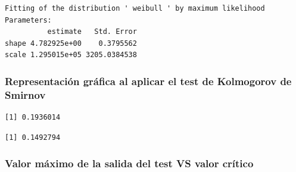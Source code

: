 \documentclass[
  us-letterpaper,
]{scrreprt}
\newenvironment{Shaded}{\begin{snugshade}}{\end{snugshade}}
\newcommand{\AttributeTok}[1]{\textcolor[rgb]{0.40,0.45,0.13}{#1}}
\newcommand{\CommentTok}[1]{\textcolor[rgb]{0.37,0.37,0.37}{#1}}
\newcommand{\ConstantTok}[1]{\textcolor[rgb]{0.56,0.35,0.01}{#1}}
\newcommand{\ControlFlowTok}[1]{\textcolor[rgb]{0.00,0.23,0.31}{\textbf{#1}}}
\newcommand{\DecValTok}[1]{\textcolor[rgb]{0.68,0.00,0.00}{#1}}
\newcommand{\FloatTok}[1]{\textcolor[rgb]{0.68,0.00,0.00}{#1}}
\newcommand{\FunctionTok}[1]{\textcolor[rgb]{0.28,0.35,0.67}{#1}}
\newcommand{\NormalTok}[1]{\textcolor[rgb]{0.00,0.23,0.31}{#1}}
\newcommand{\OtherTok}[1]{\textcolor[rgb]{0.00,0.23,0.31}{#1}}
\newcommand{\SpecialCharTok}[1]{\textcolor[rgb]{0.37,0.37,0.37}{#1}}
\theoremstyle{plain}
\theoremstyle{plain}
\theoremstyle{definition}
\theoremstyle{remark}
\begin{document}
\begin{verbatim}
Fitting of the distribution ' weibull ' by maximum likelihood 
Parameters:
          estimate   Std. Error
shape 4.782925e+00    0.3795562
scale 1.295015e+05 3205.0384538
\end{verbatim}

\begin{Shaded}
\end{Shaded}

\subsubsection{Representación gráfica al aplicar el test de Kolmogorov
de
Smirnov}\label{representaciuxf3n-gruxe1fica-al-aplicar-el-test-de-kolmogorov-de-smirnov}

\begin{verbatim}
[1] 0.1936014
\end{verbatim}

\begin{verbatim}
[1] 0.1492794
\end{verbatim}

\subsubsection{Valor máximo de la salida del test VS valor
crítico}\label{valor-muxe1ximo-de-la-salida-del-test-vs-valor-cruxedtico}
\end{document}
